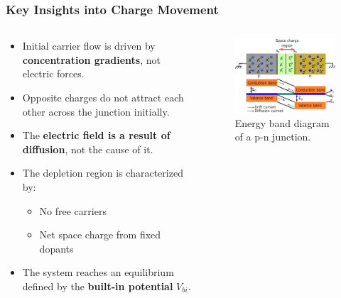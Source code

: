\begin{frame}
	\frametitle{Key Insights into Charge Movement}
	\begin{columns}
		\begin{column}{0.5\textwidth}
			\begin{itemize}
				\item Initial carrier flow is driven by \textbf{concentration gradients}, not electric forces.
				\item Opposite charges do not attract each other across the junction initially.
				\item The \textbf{electric field is a result of diffusion}, not the cause of it.
				\item The depletion region is characterized by:
				\begin{itemize}
					\item No free carriers
					\item Net space charge from fixed dopants
				\end{itemize}
				\item The system reaches an equilibrium defined by the \textbf{built-in potential} $V_{bi}$.
			\end{itemize}
		\end{column}
		\begin{column}{0.5\textwidth}
			\begin{figure}
				\centering
				\includegraphics[scale=1]{fig/lec03/band_diagram_pn_junction_big.pdf}
				\caption{Energy band diagram of a p-n junction.}
				\label{fig:pn_junction}
			\end{figure}
		\end{column}
	\end{columns}
\end{frame}


